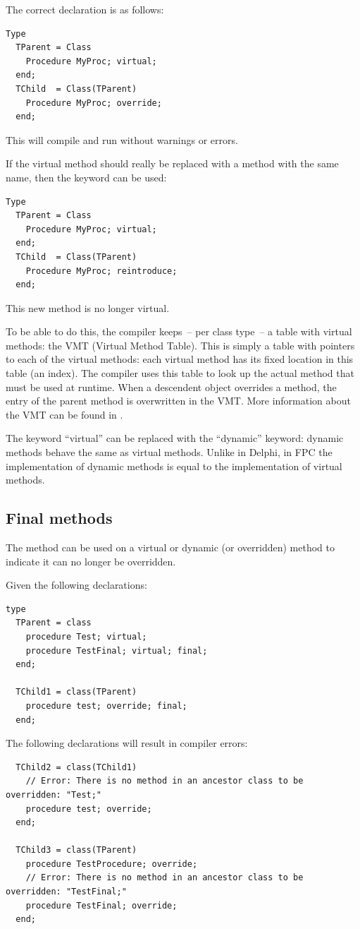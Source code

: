 The correct declaration is as follows:
\begin{verbatim}
Type
  TParent = Class
    Procedure MyProc; virtual;
  end;
  TChild  = Class(TParent)
    Procedure MyProc; override;
  end;
\end{verbatim}
This will compile and run without warnings or errors.

If the virtual method should really be replaced with a method with the
same name, then the  keyword can be used:
\begin{verbatim}
Type
  TParent = Class
    Procedure MyProc; virtual;
  end;
  TChild  = Class(TParent)
    Procedure MyProc; reintroduce;
  end;
\end{verbatim}
This new method is no longer virtual.

To be able to do this, the compiler keeps~-- per class type~-- a table with
virtual methods: the VMT (Virtual Method Table). This is simply a table
with pointers to each of the virtual methods: each virtual method has its
fixed location in this table (an index). The compiler uses this table to
look up the actual method that must be used at runtime. When a descendent object
overrides a method, the entry of the parent method is overwritten in the
VMT. More information about the VMT can be found in \progref.

\begin{remark}
The keyword ``virtual'' can be replaced with the ``dynamic'' keyword: dynamic
methods behave the same as virtual methods. Unlike in Delphi, in FPC the
implementation of dynamic methods is equal to the implementation of virtual
methods.
\end{remark}

\subsection{Final methods}
The  method can be used on a virtual or dynamic (or overridden)
method to indicate it can no longer be overridden.

Given the following declarations:
\begin{verbatim}
type
  TParent = class
    procedure Test; virtual;
    procedure TestFinal; virtual; final;
  end;

  TChild1 = class(TParent)
    procedure test; override; final;
  end;
\end{verbatim}
The following declarations will result in compiler errors:
\begin{verbatim}
  TChild2 = class(TChild1)
    // Error: There is no method in an ancestor class to be overridden: "Test;"
    procedure test; override; 
  end; 

  TChild3 = class(TParent)
    procedure TestProcedure; override;
    // Error: There is no method in an ancestor class to be overridden: "TestFinal;"
    procedure TestFinal; override;
  end;
\end{verbatim}

